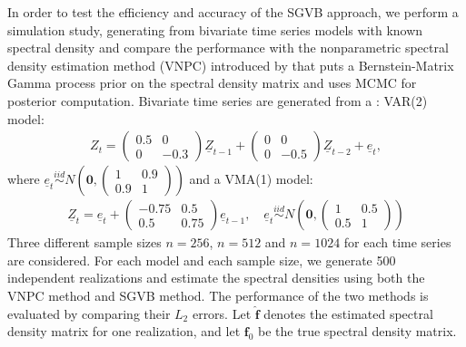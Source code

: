 \documentclass[%
 reprint,
 amsmath,amssymb,
 aps,
]{revtex4-2}
\begin{document}
In order to test the efficiency and accuracy of the SGVB approach, we perform a simulation study, generating from bivariate time series models with known spectral density and compare the performance with the nonparametric spectral density estimation method (VNPC) introduced by \cite{LiuYixuan2024Ancl} that puts a Bernstein-Matrix Gamma process prior on the spectral density matrix and  uses MCMC for posterior  computation. Bivariate time series are generated from a :
VAR(2) model:
\begin{align}
Z_t = \begin{pmatrix}0.5 & 0 \\0 & -0.3\end{pmatrix}\underline{Z}_{t-1}+\begin{pmatrix}0 & 0 \\0 & -0.5\end{pmatrix}\underline{Z}_{t-2}+\underline{e}_t, %
\end{align}
 where $\underline{e}_t\overset{iid}{\sim}N \left(\bm{0}, \begin{pmatrix}1 & 0.9 \\0.9 & 1 \end{pmatrix}  \right) $ and a VMA(1) model:
\begin{align}
\underline{Z}_t =\underline{e}_t+\begin{pmatrix}-0.75 & 0.5 \\0.5 & 0.75\end{pmatrix}\underline{e}_{t-1}, \quad \underline{e}_t\overset{iid}{\sim}N \left(\bm{0}, \begin{pmatrix}1 & 0.5 \\0.5 & 1\end{pmatrix}\right)
\end{align}
Three different sample sizes $n=256$, $n=512$ and $n=1024$ for each time series are considered. For each model and each sample size, we generate 500 independent realizations and estimate the spectral densities using both the VNPC method and SGVB method. The performance of the two methods is evaluated by comparing their 
$L_2$ errors. Let $\hat{\bm{f}}$ denotes the estimated spectral density matrix for one realization, and let $\bm{f}_0$ be the true spectral density matrix. 
\end{document}

